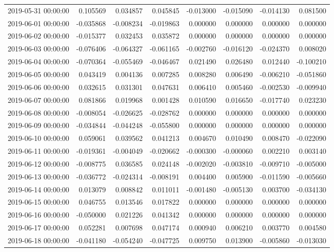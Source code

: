 \begin{tabular}{lrrrrrrr}
2019-05-31 00:00:00 & 0.105569 & 0.034857 & 0.045845 & -0.013000 & -0.015090 & -0.014130 & 0.081500 \\
2019-06-01 00:00:00 & -0.035868 & -0.008234 & -0.019863 & 0.000000 & 0.000000 & 0.000000 & 0.000000 \\
2019-06-02 00:00:00 & -0.015377 & 0.032453 & 0.035872 & 0.000000 & 0.000000 & 0.000000 & 0.000000 \\
2019-06-03 00:00:00 & -0.076406 & -0.064327 & -0.061165 & -0.002760 & -0.016120 & -0.024370 & 0.008020 \\
2019-06-04 00:00:00 & -0.070364 & -0.055469 & -0.046467 & 0.021490 & 0.026480 & 0.012440 & -0.100210 \\
2019-06-05 00:00:00 & 0.043419 & 0.004136 & 0.007285 & 0.008280 & 0.006490 & -0.006210 & -0.051860 \\
2019-06-06 00:00:00 & 0.032615 & 0.031301 & 0.047631 & 0.006410 & 0.005460 & -0.002530 & -0.009940 \\
2019-06-07 00:00:00 & 0.081866 & 0.019968 & 0.001428 & 0.010590 & 0.016650 & -0.017740 & 0.023230 \\
2019-06-08 00:00:00 & -0.008054 & -0.026625 & -0.028762 & 0.000000 & 0.000000 & 0.000000 & 0.000000 \\
2019-06-09 00:00:00 & -0.034844 & -0.044248 & -0.055800 & 0.000000 & 0.000000 & 0.000000 & 0.000000 \\
2019-06-10 00:00:00 & 0.059061 & 0.039562 & 0.041213 & 0.004670 & 0.010490 & 0.008470 & -0.022090 \\
2019-06-11 00:00:00 & -0.019361 & -0.004049 & -0.020662 & -0.000300 & -0.000060 & 0.002210 & 0.003140 \\
2019-06-12 00:00:00 & -0.008775 & 0.036585 & 0.024148 & -0.002020 & -0.003810 & -0.009710 & -0.005000 \\
2019-06-13 00:00:00 & -0.036772 & -0.024314 & -0.008191 & 0.004400 & 0.005900 & -0.011590 & -0.005660 \\
2019-06-14 00:00:00 & 0.013079 & 0.008842 & 0.011011 & -0.001480 & -0.005130 & 0.003700 & -0.034130 \\
2019-06-15 00:00:00 & 0.046755 & 0.013546 & 0.017822 & 0.000000 & 0.000000 & 0.000000 & 0.000000 \\
2019-06-16 00:00:00 & -0.050000 & 0.021226 & 0.041342 & 0.000000 & 0.000000 & 0.000000 & 0.000000 \\
2019-06-17 00:00:00 & 0.052281 & 0.007698 & 0.047174 & 0.000940 & 0.006210 & 0.003770 & 0.004580 \\
2019-06-18 00:00:00 & -0.041180 & -0.054240 & -0.047725 & 0.009750 & 0.013900 & -0.005860 & -0.013030 \\

\end{tabular}

